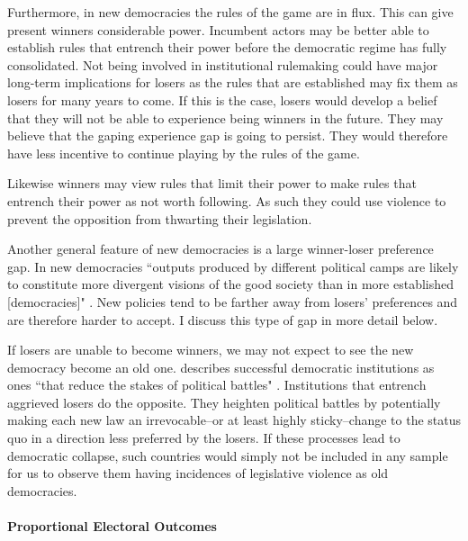 \documentclass[a4paper]{article}\usepackage{graphicx, color}
\begin{document}
Furthermore, in new democracies the rules of the game are in flux. This can give present winners considerable power. Incumbent actors may be better able to establish rules that entrench their power before the democratic regime has fully consolidated. Not being involved in institutional rulemaking could have major long-term implications for losers as the rules that are established may fix them as losers for many years to come. If this is the case, losers would develop a belief that they will not be able to experience being winners in the future. They may believe that the gaping experience gap is going to persist. They would therefore have less incentive to continue playing by the rules of the game.

Likewise winners may view rules that limit their power to make rules that entrench their power as not worth following. As such they could use violence to prevent the opposition from thwarting their legislation. 

Another general feature of new democracies is a large winner-loser preference gap. In new democracies ``outputs produced by different political camps are likely to constitute more divergent visions of the good society than in more established [democracies]" \citep[][92]{Anderson2005}. New policies tend to be farther away from losers' preferences and are therefore harder to accept. I discuss this type of gap in more detail below.

If losers are unable to become winners, we may not expect to see the new democracy become an old one. \citeauthor{Przeworski1991} describes successful democratic institutions as ones ``that reduce the stakes of political battles" \citeyearpar[][36]{Przeworski1991}. Institutions that entrench aggrieved losers do the opposite. They heighten political battles by potentially making each new law an irrevocable--or at least highly sticky--change to the status quo in a direction less preferred by the losers. If these processes lead to democratic collapse, such countries would simply not be included in any sample for us to observe them having incidences of legislative violence as old democracies. 

\paragraph{Proportional Electoral Outcomes}
\end{document}
